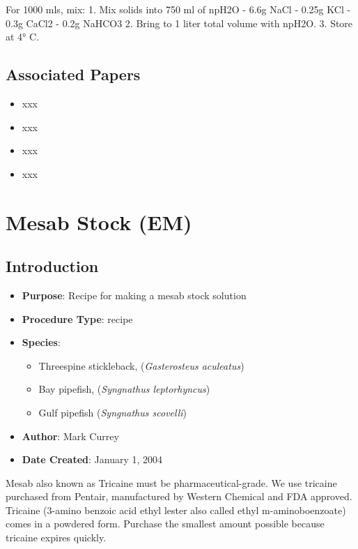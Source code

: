 \documentclass[
  letterpaper,
  DIV=11,
  numbers=noendperiod]{scrreprt}
\providecommand{\tightlist}{%
  \setlength{\itemsep}{0pt}\setlength{\parskip}{0pt}}\usepackage{longtable,booktabs,array}
\begin{document}
For 1000 mls, mix: 1. Mix solids into 750 ml of npH2O - 6.6g NaCl -
0.25g KCl - 0.3g CaCl2 - 0.2g NaHCO3 2. Bring to 1 liter total volume
with npH2O. 3. Store at 4° C.

\hypertarget{associated-papers-63}{%
\section{Associated Papers}\label{associated-papers-63}}

\begin{itemize}
\tightlist
\item
  xxx
\item
  xxx
\item
  xxx
\item
  xxx
\end{itemize}

\hypertarget{sec-recipe-mesab}{%
\chapter{Mesab Stock (EM)}\label{sec-recipe-mesab}}

\hypertarget{introduction-95}{%
\section{Introduction}\label{introduction-95}}

\begin{itemize}
\tightlist
\item
  \textbf{Purpose}: Recipe for making a mesab stock solution\\
\item
  \textbf{Procedure Type}: recipe
\item
  \textbf{Species}:

  \begin{itemize}
  \tightlist
  \item
    Threespine stickleback, (\emph{Gasterosteus aculeatus})
  \item
    Bay pipefish, (\emph{Syngnathus leptorhyncus})
  \item
    Gulf pipefish (\emph{Syngnathus scovelli})
  \end{itemize}
\item
  \textbf{Author}: Mark Currey
\item
  \textbf{Date Created}: January 1, 2004
\end{itemize}

Mesab also known as Tricaine must be pharmaceutical-grade. We use
tricaine purchased from Pentair, manufactured by Western Chemical and
FDA approved. Tricaine (3-amino benzoic acid ethyl lester also called
ethyl m-aminoboenzoate) comes in a powdered form. Purchase the smallest
amount possible because tricaine expires quickly.
\end{document}
